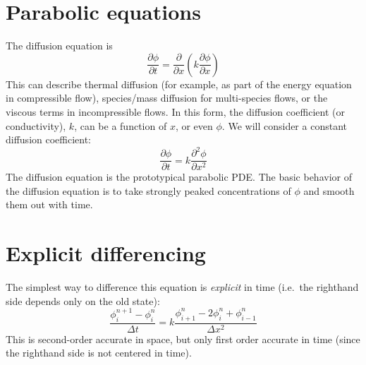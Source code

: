 \label{ch:diffusion}

\begin{quote}
\end{quote}

\section{Parabolic equations}

The diffusion equation is
\begin{equation}
\frac{\partial \phi}{\partial t} = 
  \frac{\partial }{\partial x} 
  \left ( k \frac{\partial \phi}{\partial x} \right )
\end{equation}
This can describe thermal diffusion (for example, as part of the energy
equation in compressible flow), species/mass diffusion for multi-species
flows, or the viscous terms in incompressible flows.  In this form,
the diffusion coefficient (or conductivity), $k$, can be a function
of $x$, or even $\phi$.  We will consider a constant diffusion coefficient:
\begin{equation}
\frac{\partial \phi}{\partial t} = k \frac{\partial^2 \phi}{\partial x^2}
\end{equation}
The diffusion equation is the prototypical parabolic PDE.
The basic behavior of the diffusion equation is to take strongly peaked
concentrations of $\phi$ and smooth them out with time.



\section{Explicit differencing}

The simplest way to difference this equation is {\em explicit} in time
(i.e.\ the righthand side depends only on the old state):
\begin{equation}
\label{eq:diff:explicitdiff}
\frac{\phi_i^{n+1} - \phi_i^n}{\Delta t} = 
  k \frac{\phi_{i+1}^n - 2\phi_i^n + \phi_{i-1}^n}{\Delta x^2}
\end{equation}
This is second-order accurate in space, but only first order accurate in
time (since the righthand side is not centered in time).

